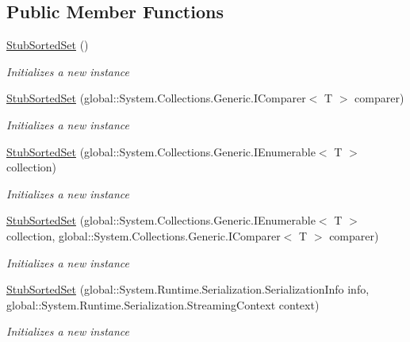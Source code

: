\subsection*{Public Member Functions}
\begin{DoxyCompactItemize}
\item 
\hyperlink{class_system_1_1_collections_1_1_generic_1_1_fakes_1_1_stub_sorted_set_3_01_t_01_4_a8ae86767f8995b5203c1f53394b159f5}{Stub\-Sorted\-Set} ()
\begin{DoxyCompactList}\small\item\em Initializes a new instance\end{DoxyCompactList}\item 
\hyperlink{class_system_1_1_collections_1_1_generic_1_1_fakes_1_1_stub_sorted_set_3_01_t_01_4_a1fff3d080e08c1b9c0fad44d6f8ee95b}{Stub\-Sorted\-Set} (global\-::\-System.\-Collections.\-Generic.\-I\-Comparer$<$ T $>$ comparer)
\begin{DoxyCompactList}\small\item\em Initializes a new instance\end{DoxyCompactList}\item 
\hyperlink{class_system_1_1_collections_1_1_generic_1_1_fakes_1_1_stub_sorted_set_3_01_t_01_4_aac4263e2ffda9fa1d017270ee4c1baa1}{Stub\-Sorted\-Set} (global\-::\-System.\-Collections.\-Generic.\-I\-Enumerable$<$ T $>$ collection)
\begin{DoxyCompactList}\small\item\em Initializes a new instance\end{DoxyCompactList}\item 
\hyperlink{class_system_1_1_collections_1_1_generic_1_1_fakes_1_1_stub_sorted_set_3_01_t_01_4_aa4a9deec36b6af1befbd49d65371e0ba}{Stub\-Sorted\-Set} (global\-::\-System.\-Collections.\-Generic.\-I\-Enumerable$<$ T $>$ collection, global\-::\-System.\-Collections.\-Generic.\-I\-Comparer$<$ T $>$ comparer)
\begin{DoxyCompactList}\small\item\em Initializes a new instance\end{DoxyCompactList}\item 
\hyperlink{class_system_1_1_collections_1_1_generic_1_1_fakes_1_1_stub_sorted_set_3_01_t_01_4_aa7d1147185be8aac9294049f774fb6eb}{Stub\-Sorted\-Set} (global\-::\-System.\-Runtime.\-Serialization.\-Serialization\-Info info, global\-::\-System.\-Runtime.\-Serialization.\-Streaming\-Context context)
\begin{DoxyCompactList}\small\item\em Initializes a new instance\end{DoxyCompactList}\item 

\end{DoxyCompactItemize}
